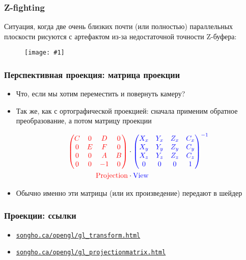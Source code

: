 \documentclass{beamer}
\newcommand{\slideimage}[1]{
  \begin{figure}
    \begin{adjustbox}{width=\textwidth, totalheight=\textheight-2\baselineskip-2\baselineskip,keepaspectratio}
      \texttt{[image: \#1]}
    \end{adjustbox}
  \end{figure}
}
\begin{document}
\begin{frame}[fragile]
\frametitle{Z-fighting}
Ситуация, когда две очень близких почти (или полностью) параллельных плоскости рисуются с артефактом из-за недостаточной точности Z-буфера:
\slideimage{z-fighting.png}
\end{frame}

\begin{frame}[fragile]
\frametitle{Перспективная проекция: матрица проекции}
\begin{itemize}
\item Что, если мы хотим переместить и повернуть камеру?
\pause
\item Так же, как с ортографической проекцией: сначала применим обратное преобразование, а потом матрицу проекции
\pause
\begin{center}
\begin{equation}
\begin{split}
{\color{red}
\begin{pmatrix}
C & 0 & D & 0 \\
0 & E & F & 0 \\
0 & 0 & A & B \\
0 & 0 & -1 & 0
\end{pmatrix}
}
& \cdot
{\color{blue}
\begin{pmatrix}
X_x & Y_x & Z_x & C_x \\
X_y & Y_y & Z_y & C_y \\
X_z & Y_z & Z_z & C_z \\
0 & 0 & 0 & 1
\end{pmatrix}^{-1}
}
\\
{\color{red}
\operatorname{Projection}
}
& \cdot
{\color{blue}
\operatorname{View}
}
\end{split}
\end{equation}
\end{center}
\pause
\item Обычно именно эти матрицы (или их произведение) передают в шейдер
\end{itemize}
\end{frame}

\begin{frame}[fragile]
\frametitle{Проекции: ссылки}
\begin{itemize}
\item \href{http://songho.ca/opengl/gl_transform.html}{\nolinkurl{songho.ca/opengl/gl\_transform.html}}
\item \href{http://songho.ca/opengl/gl_projectionmatrix.html}{\nolinkurl{songho.ca/opengl/gl\_projectionmatrix.html}}
\end{itemize}
\end{frame}
\end{document}
